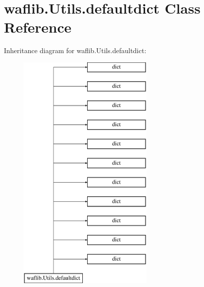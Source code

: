 \hypertarget{classwaflib_1_1_utils_1_1defaultdict}{}\section{waflib.\+Utils.\+defaultdict Class Reference}
\label{classwaflib_1_1_utils_1_1defaultdict}
Inheritance diagram for waflib.\+Utils.\+defaultdict\+:\begin{figure}[H]
\begin{center}
\leavevmode
\includegraphics[height=12.000000cm]{classwaflib_1_1_utils_1_1defaultdict}
\end{center}
\end{figure}

